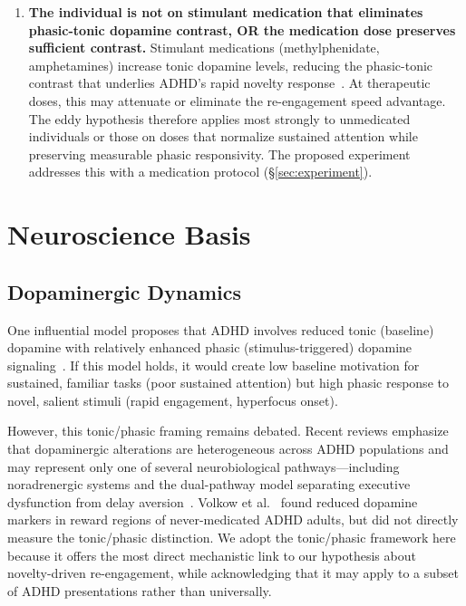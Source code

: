 \documentclass[sigconf,nonacm]{acmart}
\begin{document}
\begin{enumerate}
\item \textbf{The individual is not on stimulant medication that eliminates phasic-tonic dopamine contrast, OR the medication dose preserves sufficient contrast.} Stimulant medications (methylphenidate, amphetamines) increase tonic dopamine levels, reducing the phasic-tonic contrast that underlies ADHD's rapid novelty response~\cite{grace2001, cortese2025}. At therapeutic doses, this may attenuate or eliminate the re-engagement speed advantage. The eddy hypothesis therefore applies most strongly to unmedicated individuals or those on doses that normalize sustained attention while preserving measurable phasic responsivity. The proposed experiment addresses this with a medication protocol (\S\ref{sec:experiment}).
\end{enumerate}

\section{Neuroscience Basis}
\label{sec:neuro}

\subsection{Dopaminergic Dynamics}

One influential model proposes that ADHD involves reduced tonic (baseline) dopamine with relatively enhanced phasic (stimulus-triggered) dopamine signaling~\cite{grace2001, badgaiyan2015}. If this model holds, it would create low baseline motivation for sustained, familiar tasks (poor sustained attention) but high phasic response to novel, salient stimuli (rapid engagement, hyperfocus onset).

However, this tonic/phasic framing remains debated. Recent reviews emphasize that dopaminergic alterations are heterogeneous across ADHD populations and may represent only one of several neurobiological pathways---including noradrenergic systems and the dual-pathway model separating executive dysfunction from delay aversion~\cite{macdonald2024, faraone2021}. Volkow et al.~\cite{volkow2009} found reduced dopamine markers in reward regions of never-medicated ADHD adults, but did not directly measure the tonic/phasic distinction. We adopt the tonic/phasic framework here because it offers the most direct mechanistic link to our hypothesis about novelty-driven re-engagement, while acknowledging that it may apply to a subset of ADHD presentations rather than universally.
\end{document}
